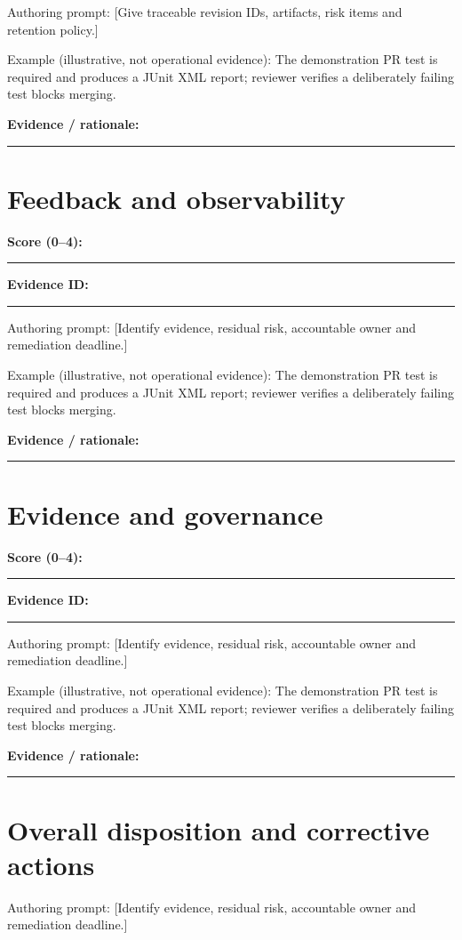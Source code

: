 \documentclass[11pt,letterpaper]{article}
\begin{document}
Authoring prompt: [Give traceable revision IDs, artifacts, risk items and retention policy.]

Example (illustrative, not operational evidence): The demonstration PR test is required and produces a JUnit XML report; reviewer verifies a deliberately failing test blocks merging.

\noindent\textbf{Evidence / rationale:}\par\nobreak\vspace{8pt}\noindent\rule{0.93\linewidth}{0.4pt}\par\vspace{14pt}
\section{Feedback and observability}
\noindent\textbf{Score (0--4):}\rule{2cm}{0.4pt}\quad\textbf{Evidence ID:}\rule{4cm}{0.4pt}

Authoring prompt: [Identify evidence, residual risk, accountable owner and remediation deadline.]

Example (illustrative, not operational evidence): The demonstration PR test is required and produces a JUnit XML report; reviewer verifies a deliberately failing test blocks merging.

\noindent\textbf{Evidence / rationale:}\par\nobreak\vspace{8pt}\noindent\rule{0.93\linewidth}{0.4pt}\par\vspace{14pt}
\section{Evidence and governance}
\noindent\textbf{Score (0--4):}\rule{2cm}{0.4pt}\quad\textbf{Evidence ID:}\rule{4cm}{0.4pt}

Authoring prompt: [Identify evidence, residual risk, accountable owner and remediation deadline.]

Example (illustrative, not operational evidence): The demonstration PR test is required and produces a JUnit XML report; reviewer verifies a deliberately failing test blocks merging.

\noindent\textbf{Evidence / rationale:}\par\nobreak\vspace{8pt}\noindent\rule{0.93\linewidth}{0.4pt}\par\vspace{14pt}
\section{Overall disposition and corrective actions}
Authoring prompt: [Identify evidence, residual risk, accountable owner and remediation deadline.]
\end{document}
